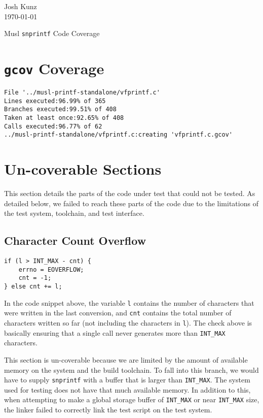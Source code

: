 \documentclass[12pt]{article}
\begin{document}
\begin{flushright}
    Josh Kunz \\
    \today
\end{flushright}
\begin{center}
    \Large Musl \texttt{snprintf} Code Coverage
\end{center}

\section{\texttt{gcov} Coverage}
\begin{verbatim}
File '../musl-printf-standalone/vfprintf.c'
Lines executed:96.99% of 365
Branches executed:99.51% of 408
Taken at least once:92.65% of 408
Calls executed:96.77% of 62
../musl-printf-standalone/vfprintf.c:creating 'vfprintf.c.gcov'
\end{verbatim}

\section{Un-coverable Sections}
This section details the parts of the code under test that could not be
tested. As detailed below, we failed to reach these parts of the code
due to the limitations of the test system, toolchain, and test interface.

\subsection{Character Count Overflow}
\begin{lstlisting}[firstnumber=470]
if (l > INT_MAX - cnt) {
    errno = EOVERFLOW;
    cnt = -1;
} else cnt += l;
\end{lstlisting}

In the code snippet above, the variable \verb|l| contains the number of
characters that were written in the last conversion, 
and \verb|cnt| contains the total
number of characters written so far (not including the characters in \verb|l|).
The check above is basically ensuring that a single call never generates more
than \verb|INT_MAX| characters.

This section is un-coverable because we are limited by the amount of available 
memory
on the system and the build toolchain. To fall into this branch, we would have
to supply \verb|snprintf| with a buffer that is larger than \verb|INT_MAX|. 
The system used for testing does not have that much available memory.
In addition to this, when attempting to make a global storage buffer of
\verb|INT_MAX| or near \verb|INT_MAX| size, the linker failed to correctly 
link the test script on the test system.
\end{document}
